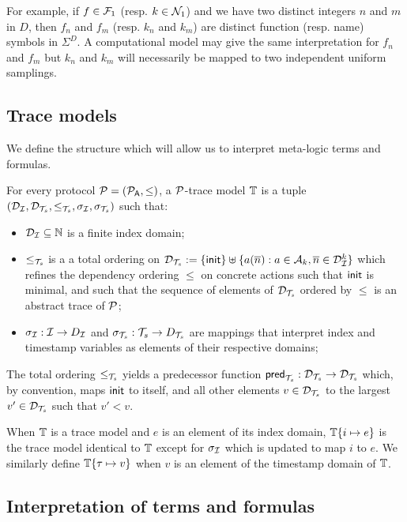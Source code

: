 For example, if $f \in \mathcal{F}_1$ (resp. $k \in \mathcal{N}_1$) and we have two distinct
integers $n$ and $m$ in $D$, then $f_n$ and $f_m$ (resp. $k_n$ and $k_m$)
are distinct function (resp. name) symbols in $\Sigma^D$.
A computational model may give the same interpretation for $f_n$ and $f_m$
but $k_n$ and $k_m$ will necessarily be mapped to two independent uniform
samplings.

\subsection{Trace models}

We define the structure which will allow us to interpret meta-logic
terms and formulas.

\begin{definition}
  For every protocol $\mathcal{P} = (\mathcal{P}_{\textsf{A}}, \leq)$, a $\mathcal{P}$-trace model $\mathbb{T}$ is a tuple
  \(
    (\mathcal{D}_{\mathcal{I}}, \mathcal{D}_{\mathcal{T}_s}, \leq_{\mathcal{T}_s}, \sigma_{\mathcal{I}}, \sigma_{\mathcal{T}_s})
  \) such that:
  \begin{itemize}
    \item $\mathcal{D}_{\mathcal{I}} \subseteq \mathbb{N}$ is a finite index domain;
    \item $\leq_{\mathcal{T}_s}$ is a a total ordering on
      $\mathcal{D}_{\mathcal{T}_s} := \{ \mathsf{init} \} \uplus \{ a(\overline{n}) : a\in\mathcal{A}_k, \overline{n}\in\mathcal{D}_{\mathcal{I}}^k
      \}$ which refines the dependency ordering $\leq$ on concrete actions such
      that $\mathsf{init}$ is minimal, and such that the sequence of elements of $\mathcal{D}_{\mathcal{T}_s}$ ordered by $\leq$ is an
      abstract trace of $\mathcal{P}$;
    \item $\sigma_{\mathcal{I}} : \mathcal{I} \to D_{\mathcal{I}}$
      and $\sigma_{\mathcal{T}_s} : {\mathcal{T}_s} \to D_{\mathcal{T}_s}$ are mappings that interpret index and
      timestamp variables as elements of their respective domains;
  \end{itemize}
\end{definition}

The total ordering $\leq_{\mathcal{T}_s}$ yields a predecessor function
$\mathsf{pred}_{\mathcal{T}_s} : \mathcal{D}_{\mathcal{T}_s}\to\mathcal{D}_{\mathcal{T}_s}$ which,
by convention, maps $\mathsf{init}$ to itself,
and all other elements $v \in \mathcal{D}_{\mathcal{T}_s}$ to the largest $v' \in \mathcal{D}_{\mathcal{T}_s}$ such that
$v' < v$.

When $\mathbb{T}$ is a trace model and $e$ is an element of its index domain,
$\mathbb{T}\{i\mapsto e\}$ is the trace model identical to $\mathbb{T}$ except for
$\sigma_{\mathcal{I}}$ which is updated to map $i$ to $e$. We similarly define
$\mathbb{T}\{\tau\mapsto v\}$ when $v$ is an element of the timestamp domain of $\mathbb{T}$.

\subsection{Interpretation of terms and formulas}

